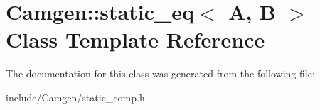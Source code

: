 \hypertarget{a00519}{}\section{Camgen\+:\+:static\+\_\+eq$<$ A, B $>$ Class Template Reference}
\label{a00519}


The documentation for this class was generated from the following file\+:\begin{DoxyCompactItemize}
\item 
include/\+Camgen/static\+\_\+comp.\+h\end{DoxyCompactItemize}
